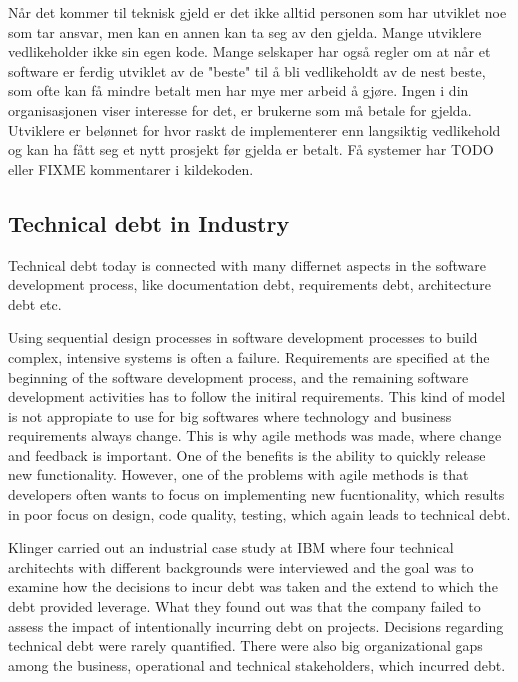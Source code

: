 Når det kommer til teknisk gjeld er det ikke alltid personen som har utviklet noe som tar ansvar, men kan en annen kan ta seg av den gjelda. Mange utviklere vedlikeholder ikke sin egen kode. Mange selskaper har også regler om at når et software er ferdig utviklet av de "beste" til å bli vedlikeholdt av de nest beste, som ofte kan få mindre betalt men har mye mer arbeid å gjøre. Ingen i din organisasjonen viser interesse for det, er brukerne som må betale for gjelda. Utviklere er belønnet for hvor raskt de implementerer enn langsiktig vedlikehold og kan ha fått seg et nytt prosjekt før gjelda er betalt. Få systemer har TODO eller FIXME kommentarer i kildekoden. 




\subsection{Technical debt in Industry}
Technical debt today is connected with many differnet aspects in the software development process, like documentation debt, requirements debt, architecture debt etc. 

Using sequential design processes in software development processes to build complex, intensive systems is often a failure. Requirements are specified at the beginning of the software development process, and the remaining software development activities has to follow the initiral requirements. This kind of model is not appropiate to use for big softwares where technology and business requirements always change. This is why agile methods was made, where change and feedback is important. One of the benefits is the ability to quickly release new functionality. However, one of the problems with agile methods is that developers often wants to focus on implementing new fucntionality, which results in poor focus on design, code quality, testing, which again leads to technical debt.  

Klinger carried out an industrial case study at IBM where four technical architechts with different backgrounds were interviewed and the goal was to examine how the decisions to incur debt was taken and the extend to which the debt provided leverage\cite{p35-klinger}. What they found out was that the company failed to assess the impact of intentionally incurring debt on projects. Decisions regarding technical debt were rarely quantified. There were also big organizational gaps among the business, operational and technical stakeholders, which incurred debt.

